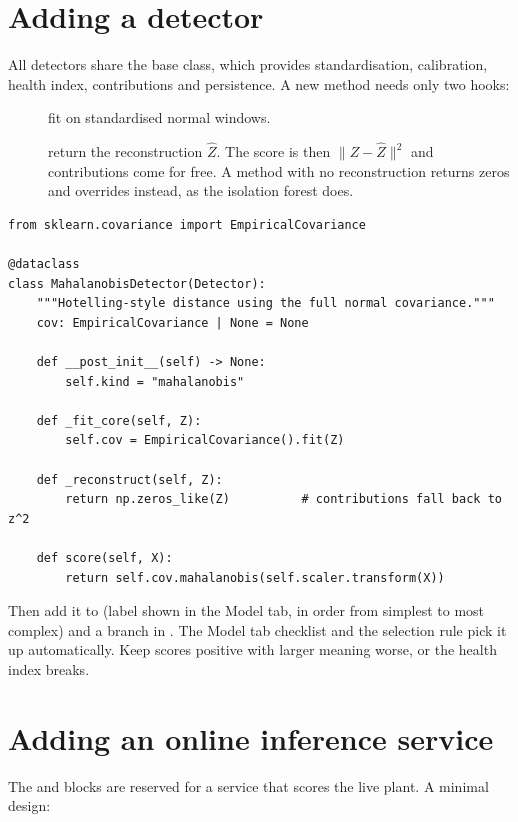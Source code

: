 \section{Adding a detector}

All detectors share the  base class, which provides
standardisation, calibration, health index, contributions and persistence.
A new method needs only two hooks:

\begin{description}
  \item[] fit on standardised normal windows.
  \item[] return the reconstruction $\hat Z$. The score
        is then $\lVert Z - \hat Z\rVert^2$ and contributions come for free.
        A method with no reconstruction returns zeros and overrides
         instead, as the isolation forest does.
\end{description}

\begin{lstlisting}
from sklearn.covariance import EmpiricalCovariance

@dataclass
class MahalanobisDetector(Detector):
    """Hotelling-style distance using the full normal covariance."""
    cov: EmpiricalCovariance | None = None

    def __post_init__(self) -> None:
        self.kind = "mahalanobis"

    def _fit_core(self, Z):
        self.cov = EmpiricalCovariance().fit(Z)

    def _reconstruct(self, Z):
        return np.zeros_like(Z)          # contributions fall back to z^2

    def score(self, X):
        return self.cov.mahalanobis(self.scaler.transform(X))
\end{lstlisting}

Then add it to  (label shown in the Model tab, in order from
simplest to most complex) and a branch in . The Model
tab checklist and the selection rule pick it up automatically. Keep scores
positive with larger meaning worse, or the health index breaks.

\section{Adding an online inference service}

The  and  blocks are reserved for a service
that scores the live plant. A minimal design:

